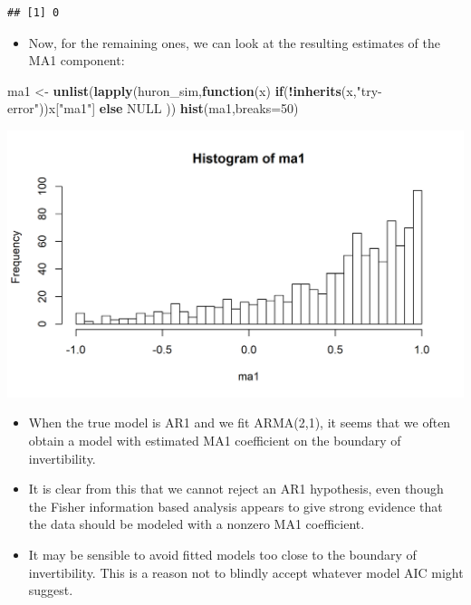 \documentclass[]{article}
\newenvironment{Shaded}{\begin{snugshade}}{\end{snugshade}}
\newcommand{\KeywordTok}[1]{\textcolor[rgb]{0.13,0.29,0.53}{\textbf{#1}}}
\newcommand{\DataTypeTok}[1]{\textcolor[rgb]{0.13,0.29,0.53}{#1}}
\newcommand{\DecValTok}[1]{\textcolor[rgb]{0.00,0.00,0.81}{#1}}
\newcommand{\StringTok}[1]{\textcolor[rgb]{0.31,0.60,0.02}{#1}}
\newcommand{\OtherTok}[1]{\textcolor[rgb]{0.56,0.35,0.01}{#1}}
\newcommand{\ControlFlowTok}[1]{\textcolor[rgb]{0.13,0.29,0.53}{\textbf{#1}}}
\newcommand{\OperatorTok}[1]{\textcolor[rgb]{0.81,0.36,0.00}{\textbf{#1}}}
\newcommand{\NormalTok}[1]{#1}
\providecommand{\tightlist}{%
  \setlength{\itemsep}{0pt}\setlength{\parskip}{0pt}}
\begin{document}
\begin{verbatim}
## [1] 0
\end{verbatim}

\begin{itemize}
\tightlist
\item
  Now, for the remaining ones, we can look at the resulting estimates of
  the MA1 component:
\end{itemize}

\begin{Shaded}
\begin{Highlighting}[]
\NormalTok{ma1 <-}\StringTok{ }\KeywordTok{unlist}\NormalTok{(}\KeywordTok{lapply}\NormalTok{(huron_sim,}\ControlFlowTok{function}\NormalTok{(x) }\ControlFlowTok{if}\NormalTok{(}\OperatorTok{!}\KeywordTok{inherits}\NormalTok{(x,}\StringTok{"try-error"}\NormalTok{))x[}\StringTok{"ma1"}\NormalTok{] }\ControlFlowTok{else} \OtherTok{NULL}\NormalTok{ ))}
\KeywordTok{hist}\NormalTok{(ma1,}\DataTypeTok{breaks=}\DecValTok{50}\NormalTok{)  }
\end{Highlighting}
\end{Shaded}

\begin{center}\includegraphics{figure/intro-histB-1} \end{center}

\begin{itemize}
\item
  When the true model is AR1 and we fit ARMA(2,1), it seems that we
  often obtain a model with estimated MA1 coefficient on the boundary of
  invertibility.
\item
  It is clear from this that we cannot reject an AR1 hypothesis, even
  though the Fisher information based analysis appears to give strong
  evidence that the data should be modeled with a nonzero MA1
  coefficient.
\item
  It may be sensible to avoid fitted models too close to the boundary of
  invertibility. This is a reason not to blindly accept whatever model
  AIC might suggest.
\end{itemize}
\end{document}
